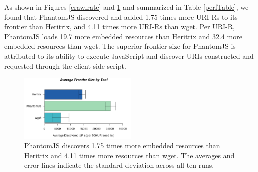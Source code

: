 \documentclass{sig-alternate}
\begin{document}
As shown in Figures \ref{crawlrate} and \ref{frontiersize} and summarized in Table \ref{perfTable}, we found that PhantomJS discovered and added 
1.75 times more URI-Rs to its frontier than Heritrix, and 4.11 times more URI-Rs than wget. Per URI-R, PhantomJS loads 19.7 more embedded resources than Heritrix and 32.4 more embedded resources than wget. The superior frontier size for PhantomJS is attributed to its ability to execute JavaScript and discover URIs constructed and requested through the client-side script.

\begin{figure}
  \begin{center}
    \includegraphics[width=0.5\textwidth]{./imgs/sizeBarStats.png}
  \end{center}
  \caption{PhantomJS discovers 1.75 times more embedded resources than Heritrix and 4.11 times more resources than wget. The averages and error lines indicate the standard deviation across all ten runs.}
  \label{frontiersize}
\end{figure}


\end{document}
